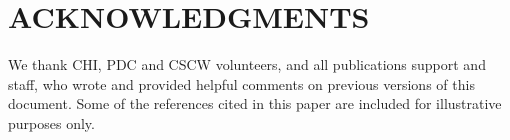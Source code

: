 \documentclass{chi2012}
\begin{document}
\section{ACKNOWLEDGMENTS}

We thank CHI, PDC and CSCW volunteers, and all publications support
and staff, who wrote and provided helpful comments on previous
versions of this document.  Some of the references cited in this paper
are included for illustrative purposes only.

\balancecolumns


\end{document}
